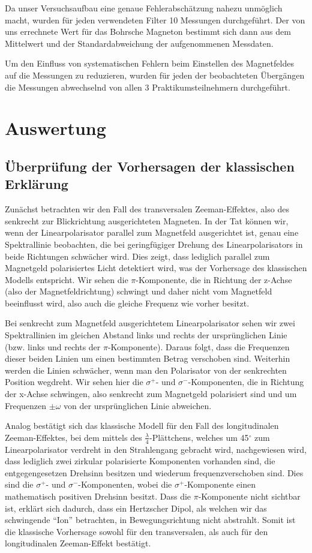 \documentclass[bigchapter,colorback,accentcolor=tud4b,linedtoc,11pt]{tudreport}
\begin{document}
Da unser Versuchsaufbau eine genaue Fehlerabschätzung nahezu unmöglich macht,
wurden für jeden verwendeten Filter 10 Messungen durchgeführt. Der von uns
errechnete Wert für das Bohrsche Magneton bestimmt sich dann aus dem Mittelwert
und der Standardabweichung der aufgenommenen Messdaten.

Um den Einfluss von systematischen Fehlern beim Einstellen des Magnetfeldes auf
die Messungen zu reduzieren, wurden für jeden der beobachteten Übergängen die
Messungen abwechselnd von allen 3 Praktikumsteilnehmern durchgeführt.


\chapter{Auswertung}
\section{Überprüfung der Vorhersagen der klassischen Erklärung}

Zunächst betrachten wir den Fall des transversalen Zeeman-Effektes, also des senkrecht zur Blickrichtung ausgerichteten Magneten. In der Tat können wir, wenn der Linearpolarisator parallel zum Magnetfeld ausgerichtet ist, genau eine Spektrallinie beobachten, die bei geringfügiger Drehung des Linearpolarisators in beide Richtungen schwächer wird. Dies zeigt, dass lediglich parallel zum Magnetgeld polarisiertes Licht detektiert wird, was der Vorhersage des klassischen Modells entspricht. Wir sehen die $\pi$-Komponente, die in Richtung der z-Achse (also der Magnetfeldrichtung) schwingt und daher nicht vom Magnetfeld beeinflusst wird, also auch die gleiche Frequenz wie vorher besitzt.

Bei senkrecht zum Magnetfeld ausgerichtetem Linearpolarisator sehen wir zwei Spektrallinien im gleichen Abstand links und rechts der ursprünglichen Linie (bzw. links und rechts der $\pi$-Komponente). Daraus folgt, dass die Frequenzen dieser beiden Linien um einen bestimmten Betrag verschoben sind. Weiterhin werden die Linien schwächer, wenn man den Polarisator von der senkrechten Position wegdreht. Wir sehen hier die $\sigma^+$- und $\sigma^-$-Komponenten, die in Richtung der x-Achse schwingen, also senkrecht zum Magnetgeld polarisiert sind und um Frequenzen $\pm \omega$ von der ursprünglichen Linie abweichen.

Analog bestätigt sich das klassische Modell für den Fall des longitudinalen Zeeman-Effektes, bei dem mittels des $\frac{\lambda}{4}$-Plättchens, welches um 45$^{\circ}$ zum Linearpolarisator verdreht in den Strahlengang gebracht wird, nachgewiesen wird, dass lediglich zwei zirkular polarisierte Komponenten vorhanden sind, die entgegengesetzen Drehsinn besitzen und wiederum frequenzverschoben sind. Dies sind die $\sigma^+$- und $\sigma^-$-Komponenten, wobei die $\sigma^+$-Komponente einen mathematisch positiven Drehsinn besitzt. Dass die $\pi$-Komponente nicht sichtbar ist, erklärt sich dadurch, dass ein Hertzscher Dipol, als welchen wir das schwingende "`Ion"' betrachten, in Bewegungsrichtung nicht abstrahlt. Somit ist die klassische Vorhersage sowohl für den transversalen, als auch für den longitudinalen Zeeman-Effekt bestätigt.
\end{document}
